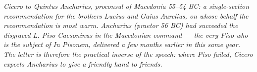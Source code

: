 
\textit{Cicero to Quintus Ancharius, proconsul of Macedonia
55--54 BC: a single-section recommendation for the brothers
Lucius and Gaius Aurelius, on whose behalf the recommendation
is most warm. Ancharius (praetor 56 BC) had succeeded the
disgraced L. Piso Caesoninus in the Macedonian command — the
very Piso who is the subject of \textit{In Pisonem}, delivered
a few months earlier in this same year. The letter is therefore
the practical inverse of the speech: where Piso failed, Cicero
expects Ancharius to give a friendly hand to friends.}
